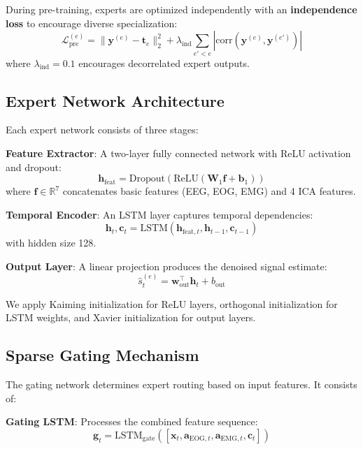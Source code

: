 \documentclass{article}
\begin{document}
During pre-training, experts are optimized independently with an \textbf{independence loss} to encourage diverse specialization:
\begin{equation}
\mathcal{L}_{\text{pre}}^{(e)} = \|\mathbf{y}^{(e)} - \mathbf{t}_e\|_2^2 + \lambda_{\text{ind}} \sum_{e' < e} |\text{corr}(\mathbf{y}^{(e)}, \mathbf{y}^{(e')})|
\end{equation}
where $\lambda_{\text{ind}} = 0.1$ encourages decorrelated expert outputs.

\subsection{Expert Network Architecture}

Each expert network consists of three stages:

\textbf{Feature Extractor}: A two-layer fully connected network with ReLU activation and dropout:
\begin{equation}
\mathbf{h}_{\text{feat}} = \text{Dropout}(\text{ReLU}(\mathbf{W}_1 \mathbf{f} + \mathbf{b}_1))
\end{equation}
where $\mathbf{f} \in \mathbb{R}^7$ concatenates basic features (EEG, EOG, EMG) and 4 ICA features.

\textbf{Temporal Encoder}: An LSTM layer captures temporal dependencies:
\begin{equation}
\mathbf{h}_t, \mathbf{c}_t = \text{LSTM}(\mathbf{h}_{\text{feat},t}, \mathbf{h}_{t-1}, \mathbf{c}_{t-1})
\end{equation}
with hidden size 128.

\textbf{Output Layer}: A linear projection produces the denoised signal estimate:
\begin{equation}
\hat{s}_t^{(e)} = \mathbf{w}_{\text{out}}^\top \mathbf{h}_t + b_{\text{out}}
\end{equation}

We apply Kaiming initialization \cite{he2015delving} for ReLU layers, orthogonal initialization for LSTM weights, and Xavier initialization \cite{glorot2010understanding} for output layers.

\subsection{Sparse Gating Mechanism}

The gating network determines expert routing based on input features. It consists of:

\textbf{Gating LSTM}: Processes the combined feature sequence:
\begin{equation}
\mathbf{g}_t = \text{LSTM}_{\text{gate}}([\mathbf{x}_t, \mathbf{a}_{\text{EOG},t}, \mathbf{a}_{\text{EMG},t}, \mathbf{c}_t])
\end{equation}
\end{document}
